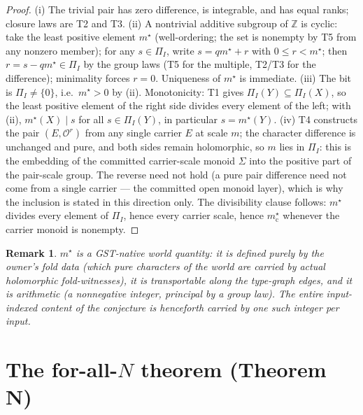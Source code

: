 \documentclass[11pt]{article}
\newtheorem{remark}[theorem]{Remark}
\newcommand{\Oo}{\mathcal{O}}
\newcommand{\Z}{\mathbb{Z}}
\begin{document}
\begin{proof}
(i) The trivial pair has zero difference, is integrable, and has equal ranks;
closure laws are T2 and T3.  (ii) A nontrivial additive subgroup of $\Z$ is
cyclic: take the least positive element $m^\star$ (well-ordering; the set is
nonempty by T5 from any nonzero member); for any $s\in\Pi_I$, write
$s=qm^\star+r$ with $0\le r<m^\star$; then
$r=s-qm^\star\in\Pi_I$ by the group laws (T5 for the multiple, T2/T3 for the
difference); minimality forces $r=0$.  Uniqueness of $m^\star$ is immediate.
(iii) The bit is $\Pi_I\ne\{0\}$, i.e.\ $m^\star>0$ by (ii).  Monotonicity:
T1 gives $\Pi_I(Y)\subseteq\Pi_I(X)$, so the least positive element of the
right side divides every element of the left; with (ii),
$m^\star(X)\mid s$ for all $s\in\Pi_I(Y)$, in particular
$s=m^\star(Y)$.  (iv) T4 constructs the pair $(E,\Oo^{r})$ from any single
carrier $E$ at scale $m$; the character difference is unchanged and pure, and
both sides remain holomorphic, so $m$ lies in $\Pi_I$: this is the embedding
of the committed carrier-scale monoid $\Sigma$ into the positive part of the
pair-scale group.  The reverse need not hold (a pure pair difference need not
come from a single carrier --- the committed open monoid layer), which is why
the inclusion is stated in this direction only.  The divisibility clause
follows: $m^\star$ divides every element of $\Pi_I$, hence every carrier
scale, hence $m^\star_{\mathrm c}$ whenever the carrier monoid is nonempty.
\end{proof}

\begin{remark}
$m^\star$ is a GST-native world quantity: it is defined purely by the owner's
fold data (which pure characters of the world are carried by actual
holomorphic fold-witnesses), it is transportable along the type-graph edges,
and it is arithmetic (a nonnegative integer, principal by a group law).  The
entire input-indexed content of the conjecture is henceforth carried by one
such integer per input.
\end{remark}

\section{The for-all-\texorpdfstring{$N$}{N} theorem (Theorem N)}
\label{sec:forallN}
\end{document}
